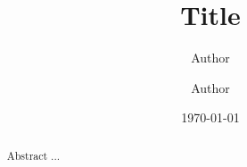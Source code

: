 \documentclass[aps,prl,reprint,superscriptaddress]{revtex4-2}
\begin{document}

\title{Title}


\author{Author}

\author{Author}

\date{\today}

\begin{abstract}

Abstract ...

\end{abstract}





\maketitle


\end{document}
